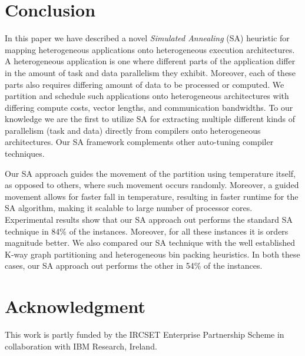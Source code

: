 \documentclass[10pt, conference, compsocconf]{IEEEtran}
\begin{document}




\section{Conclusion}
\label{sec:conclusion}

In this paper we have described a novel \textit{Simulated Annealing}
(SA) heuristic for mapping heterogeneous applications onto heterogeneous
execution architectures. A heterogeneous application is one where
different parts of the application differ in the amount of task and data
parallelism they exhibit. Moreover, each of these parts also requires
differing amount of data to be processed or computed. We partition and
schedule such applications onto heterogeneous architectures with
differing compute costs, vector lengths, and communication
bandwidths. To our knowledge we are the first to utilize SA for
extracting multiple different kinds of parallelism (task and data)
directly from compilers onto heterogeneous architectures. Our SA
framework complements other auto-tuning compiler techniques.

Our SA approach guides the movement of the partition using temperature
itself, as opposed to others, where such movement occurs
randomly. Moreover, a guided movement allows for faster fall in
temperature, resulting in faster runtime for the SA algorithm, making it
scalable to large number of processor cores. Experimental results show
that our SA approach out performs the standard SA technique in 84\% of
the instances. Moreover, for all these instances it is orders magnitude
better. We also compared our SA technique with the well established
K-way graph partitioning and heterogeneous bin packing heuristics. In
both these cases, our SA approach out performs the other in 54\% of the
instances.

\section*{Acknowledgment}
This work is partly funded by the IRCSET Enterprise Partnership Scheme in
collaboration with IBM Research, Ireland.




\scriptsize{

% 

}

\end{document}
